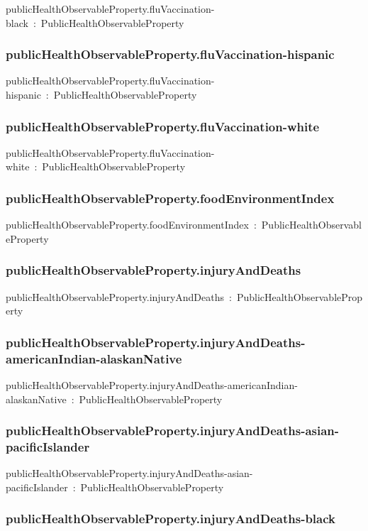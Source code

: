 \documentclass{article}
\begin{document}
publicHealthObservableProperty.fluVaccination-black~:~PublicHealthObservableProperty

\subsubsection*{publicHealthObservableProperty.fluVaccination-hispanic}

publicHealthObservableProperty.fluVaccination-hispanic~:~PublicHealthObservableProperty

\subsubsection*{publicHealthObservableProperty.fluVaccination-white}

publicHealthObservableProperty.fluVaccination-white~:~PublicHealthObservableProperty

\subsubsection*{publicHealthObservableProperty.foodEnvironmentIndex}

publicHealthObservableProperty.foodEnvironmentIndex~:~PublicHealthObservableProperty

\subsubsection*{publicHealthObservableProperty.injuryAndDeaths}

publicHealthObservableProperty.injuryAndDeaths~:~PublicHealthObservableProperty

\subsubsection*{publicHealthObservableProperty.injuryAndDeaths-americanIndian-alaskanNative}

publicHealthObservableProperty.injuryAndDeaths-americanIndian-alaskanNative~:~PublicHealthObservableProperty

\subsubsection*{publicHealthObservableProperty.injuryAndDeaths-asian-pacificIslander}

publicHealthObservableProperty.injuryAndDeaths-asian-pacificIslander~:~PublicHealthObservableProperty

\subsubsection*{publicHealthObservableProperty.injuryAndDeaths-black}
\end{document}
